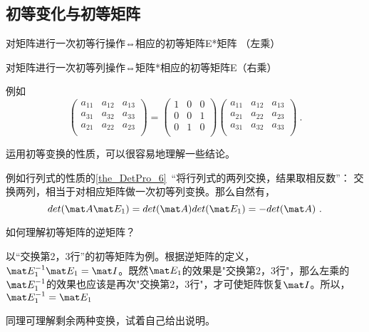 \subsection{初等变化与初等矩阵}
\begin{theorem}{}
对矩阵进行一次初等行操作⇔相应的初等矩阵E*矩阵 （左乘）

对矩阵进行一次初等列操作⇔矩阵*相应的初等矩阵E（右乘）
\end{theorem}

\begin{example}{}
例如
\begin{equation}
\begin{pmatrix}
    a_{11} & a_{12} & a_{13}\\
    a_{31} & a_{32} & a_{33}\\
    a_{21} & a_{22} & a_{23}\\
\end{pmatrix}
=
    \begin{pmatrix}
        1 & 0 & 0\\
        0 & 0 & 1\\
        0 & 1 & 0\\
    \end{pmatrix}
\begin{pmatrix}
        a_{11} & a_{12} & a_{13}\\
        a_{21} & a_{22} & a_{23}\\
        a_{31} & a_{32} & a_{33}\\
\end{pmatrix}~.
\end{equation}
\end{example}

运用初等变换的性质，可以很容易地理解一些结论。

\begin{example}{}
例如行列式的性质的\autoref{the_DetPro_6}~“将行列式的两列交换，结果取相反数”： 交换两列，相当于对相应矩阵做一次初等列变换。那么自然有，
$$det (\mat A \mat E_1)=det (\mat A) det(\mat E_1)=-det (\mat A)~.$$
\end{example}

\begin{example}{}
如何理解初等矩阵的逆矩阵？

以“交换第2，3行”的初等矩阵为例。根据逆矩阵的定义，$\mat E_1^{-1} \mat E_1 = \mat I$。既然$\mat E_1$的效果是"交换第2，3行"，那么左乘的$\mat E_1^{-1}$的效果也应该是再次"交换第2，3行"，才可使矩阵恢复$\mat I$。所以，$\mat E_1^{-1} =  \mat E_1$

同理可理解剩余两种变换，试着自己给出说明。
\end{example}

